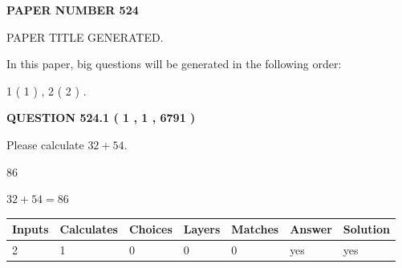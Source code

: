 \documentclass[12pt]{article}
\begin{document}
   
 {\textbf{ \Large{ PAPER NUMBER  524  }}}
   
   
\vspace{0.2in}
   
   
   
   
   
   
   
   
 \vspace{0.2in}
 
 
 
 
   
   
 PAPER TITLE GENERATED.
   
   
   
\vspace{0.2in}
   
In this paper, big questions will be generated in the following order: 
   
   
   1 ( 1 )
 ,
   2 ( 2 )
 .
  
\vspace{0.2in}
  
{\textbf{\Large{QUESTION
524.1 
 ( 1 , 1 , 6791 )
}}}
  
  
 
Please calculate $ %
32 +  %
54 $.
 
 
 
\noindent{}
 
 

86
 
 
\noindent{}
 
 

 
 
 
\noindent{}
 
 

$ %
32 +  %
54=   %
86$
 
 
\noindent{}
 
 

 
   
   
   
   
\noindent\begin{tabular}{|l|l|l|l|l|l|l|}
 \hline
Inputs & Calculates & Choices & Layers & Matches & Answer & Solution \\ \hline
 2  & 
 1  & 
 0
  & 
 0  & 
 0  & 
  yes & 
  yes 
  \\ \hline
 \end{tabular}
   
\end{document}
